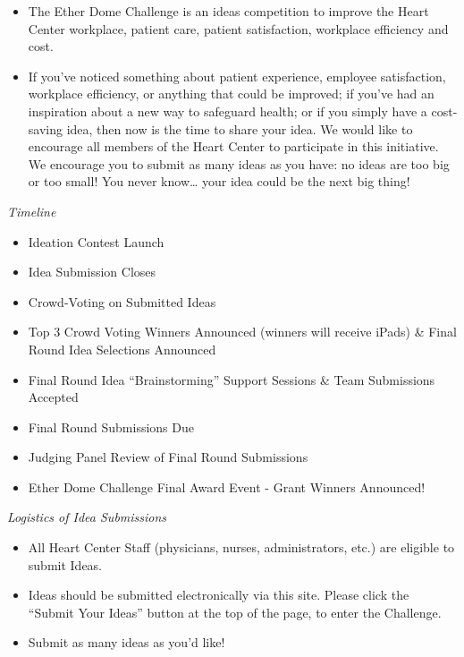 \documentclass[11pt, titlepage]{article}
\providecommand{\tightlist}{%
  \setlength{\itemsep}{0pt}\setlength{\parskip}{0pt}}
\begin{document}
\begin{itemize}
\item
  The Ether Dome Challenge is an ideas competition to improve the Heart
  Center workplace, patient care, patient satisfaction, workplace
  efficiency and cost.
\item
  If you've noticed something about patient experience, employee
  satisfaction, workplace efficiency, or anything that could be
  improved; if you've had an inspiration about a new way to safeguard
  health; or if you simply have a cost-saving idea, then now is the time
  to share your idea. We would like to encourage all members of the
  Heart Center to participate in this initiative. We encourage you to
  submit as many ideas as you have: no ideas are too big or too small!
  You never know\ldots{} your idea could be the next big thing!
\end{itemize}

\emph{Timeline}

\begin{itemize}
\tightlist
\item
  Ideation Contest Launch
\item
  Idea Submission Closes
\item
  Crowd-Voting on Submitted Ideas
\item
  Top 3 Crowd Voting Winners Announced (winners will receive iPads) \&
  Final Round Idea Selections Announced
\item
  Final Round Idea ``Brainstorming'' Support Sessions \& Team
  Submissions Accepted
\item
  Final Round Submissions Due
\item
  Judging Panel Review of Final Round Submissions
\item
  Ether Dome Challenge Final Award Event - Grant Winners Announced!
\end{itemize}

\emph{Logistics of Idea Submissions}

\begin{itemize}
\tightlist
\item
  All Heart Center Staff (physicians, nurses, administrators, etc.) are
  eligible to submit Ideas.
\item
  Ideas should be submitted electronically via this site. Please click
  the ``Submit Your Ideas'' button at the top of the page, to enter the
  Challenge.
\item
  Submit as many ideas as you'd like!
\end{itemize}
\end{document}
